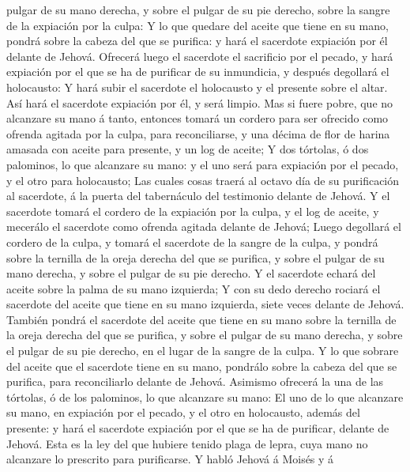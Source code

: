 pulgar de su mano derecha, y sobre el pulgar de su pie derecho, sobre la
sangre de la expiación por la culpa:  Y lo que quedare
del aceite que tiene en su mano, pondrá sobre la cabeza del que se
purifica: y hará el sacerdote expiación por él delante de Jehová.
 Ofrecerá luego el sacerdote el sacrificio por el pecado,
y hará expiación por el que se ha de purificar de su inmundicia, y
después degollará el holocausto:  Y hará subir el
sacerdote el holocausto y el presente sobre el altar. Así hará el
sacerdote expiación por él, y será limpio.  Mas si fuere
pobre, que no alcanzare su mano á tanto, entonces tomará un cordero para
ser ofrecido como ofrenda agitada por la culpa, para reconciliarse, y
una décima de flor de harina amasada con aceite para presente, y un log
de aceite;  Y dos tórtolas, ó dos palominos, lo que
alcanzare su mano: y el uno será para expiación por el pecado, y el otro
para holocausto;  Las cuales cosas traerá al octavo día
de su purificación al sacerdote, á la puerta del tabernáculo del
testimonio delante de Jehová.  Y el sacerdote tomará el
cordero de la expiación por la culpa, y el log de aceite, y mecerálo el
sacerdote como ofrenda agitada delante de Jehová;  Luego
degollará el cordero de la culpa, y tomará el sacerdote de la sangre de
la culpa, y pondrá sobre la ternilla de la oreja derecha del que se
purifica, y sobre el pulgar de su mano derecha, y sobre el pulgar de su
pie derecho.  Y el sacerdote echará del aceite sobre la
palma de su mano izquierda;  Y con su dedo derecho
rociará el sacerdote del aceite que tiene en su mano izquierda, siete
veces delante de Jehová.  También pondrá el sacerdote del
aceite que tiene en su mano sobre la ternilla de la oreja derecha del
que se purifica, y sobre el pulgar de su mano derecha, y sobre el pulgar
de su pie derecho, en el lugar de la sangre de la culpa. 
Y lo que sobrare del aceite que el sacerdote tiene en su mano, pondrálo
sobre la cabeza del que se purifica, para reconciliarlo delante de
Jehová.  Asimismo ofrecerá la una de las tórtolas, ó de
los palominos, lo que alcanzare su mano:  El uno de lo
que alcanzare su mano, en expiación por el pecado, y el otro en
holocausto, además del presente: y hará el sacerdote expiación por el
que se ha de purificar, delante de Jehová.  Esta es la
ley del que hubiere tenido plaga de lepra, cuya mano no alcanzare lo
prescrito para purificarse.  Y habló Jehová á Moisés y á
